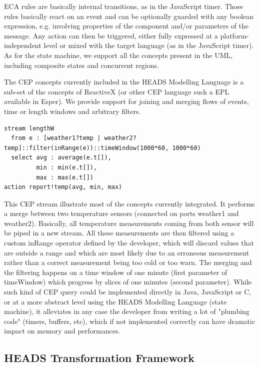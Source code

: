 ECA rules are basically internal transitions, as in the JavaScript timer. Those rules basically react on an event and can be optionally guarded with any boolean expression, e.g. involving properties of the component and/or parameters of the message. Any action can then be triggered, either fully expressed at a platform-independent level or mixed with the target language (as in the JavaScript timer). As for the state machine, we support all the concepts present in the UML, including composite states and concurrent regions.  

The CEP concepts currently included in the HEADS Modelling Language is a sub-set of the concepts of ReactiveX (or other CEP language such a EPL available in Esper). We provide support for joining and merging flows of events, time or length windows and arbitrary filters.  

\begin{lstlisting}
stream lengthW 
  from e : [weather1?temp | weather2?temp]::filter(inRange(e))::timeWindow(1000*60, 1000*60)  
  select avg : average(e.t[]),  
         min : min(e.t[]),  
         max : max(e.t[])  
action report!temp(avg, min, max)
\end{lstlisting}

This CEP stream illustrate most of the concepts currently integrated. It performs a merge between two temperature sensors (connected on ports weather1 and weather2). Basically, all temperature measurements coming from both sensor will be piped in a new stream. All these measurements are then filtered using a custom inRange operator defined by the developer, which will discard values that are outside a range and which are most likely due to an erroneous measurement rather than a correct measurement being too cold or too warn. The merging and the filtering happens on a time window of one minute (first parameter of timeWindow) which progress by slices of one minutes (second parameter). While such kind of CEP query could be implemented directly in Java, JavaScript or C, or at a more abstract level using the HEADS Modelling Language (state machine), it alleviates in any case the developer from writing a lot of "plumbing code" (timers, buffers, etc), which if not implemented correctly can have dramatic impact on memory and performances.

\subsection{HEADS Transformation Framework}

